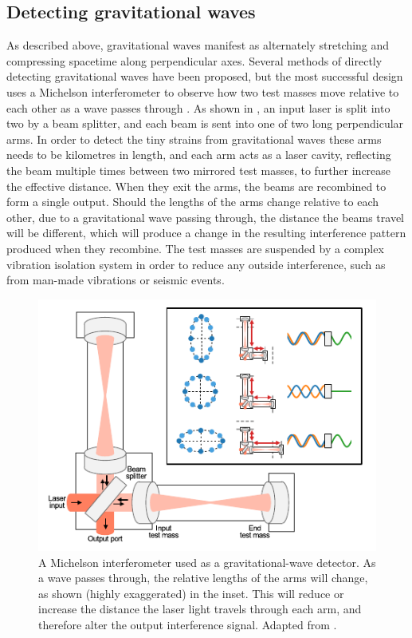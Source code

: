 \subsection{Detecting gravitational waves}
\label{sec:gw_detecting}
\begin{colsection}

As described above, gravitational waves manifest as alternately stretching and compressing spacetime along perpendicular axes. Several methods of directly detecting gravitational waves have been proposed, but the most successful design uses a Michelson interferometer to observe how two test masses move relative to each other as a wave passes through \citep{BIGbirmingham}. As shown in , an input laser is split into two by a beam splitter, and each beam is sent into one of two long perpendicular arms. In order to detect the tiny strains from gravitational waves these arms needs to be kilometres in length, and each arm acts as a laser cavity, reflecting the beam multiple times between two mirrored test masses, to further increase the effective distance. When they exit the arms, the beams are recombined to form a single output. Should the lengths of the arms change relative to each other, due to a gravitational wave passing through, the distance the beams travel will be different, which will produce a change in the resulting interference pattern produced when they recombine. The test masses are suspended by a complex vibration isolation system in order to reduce any outside interference, such as from man-made vibrations or seismic events.

\begin{figure}[t]
    \begin{center}
        \includegraphics[width=0.75\linewidth]{images/detector.pdf}
    \end{center}
    \caption[A Michelson interferometer used as a gravitational-wave detector]{
        A Michelson interferometer used as a gravitational-wave detector. As a wave passes through, the relative lengths of the arms will change, as shown (highly exaggerated) in the inset. This will reduce or increase the distance the laser light travels through each arm, and therefore alter the output interference signal. Adapted from \citet{GW150914_detectors}.
        }\label{fig:detector}
\end{figure}


\end{colsection}
